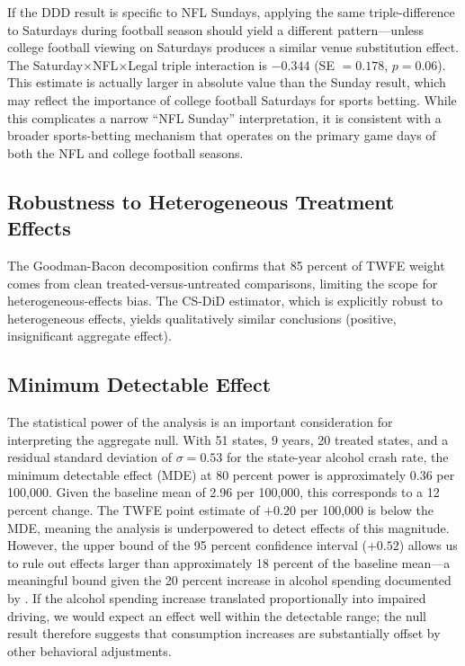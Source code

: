 \documentclass[12pt]{article}
\begin{document}
If the DDD result is specific to NFL Sundays, applying the same triple-difference to Saturdays during football season should yield a different pattern---unless college football viewing on Saturdays produces a similar venue substitution effect. The Saturday$\times$NFL$\times$Legal triple interaction is $-0.344$ (SE $= 0.178$, $p = 0.06$). This estimate is actually larger in absolute value than the Sunday result, which may reflect the importance of college football Saturdays for sports betting. While this complicates a narrow ``NFL Sunday'' interpretation, it is consistent with a broader sports-betting mechanism that operates on the primary game days of both the NFL and college football seasons.

\subsection{Robustness to Heterogeneous Treatment Effects}

The Goodman-Bacon decomposition confirms that 85 percent of TWFE weight comes from clean treated-versus-untreated comparisons, limiting the scope for heterogeneous-effects bias. The CS-DiD estimator, which is explicitly robust to heterogeneous effects, yields qualitatively similar conclusions (positive, insignificant aggregate effect).

\subsection{Minimum Detectable Effect}

The statistical power of the analysis is an important consideration for interpreting the aggregate null. With 51 states, 9 years, 20 treated states, and a residual standard deviation of $\sigma = 0.53$ for the state-year alcohol crash rate, the minimum detectable effect (MDE) at 80 percent power is approximately 0.36 per 100,000. Given the baseline mean of 2.96 per 100,000, this corresponds to a 12 percent change. The TWFE point estimate of $+0.20$ per 100,000 is below the MDE, meaning the analysis is underpowered to detect effects of this magnitude. However, the upper bound of the 95 percent confidence interval ($+0.52$) allows us to rule out effects larger than approximately 18 percent of the baseline mean---a meaningful bound given the 20 percent increase in alcohol spending documented by \citet{taylor2024betting}. If the alcohol spending increase translated proportionally into impaired driving, we would expect an effect well within the detectable range; the null result therefore suggests that consumption increases are substantially offset by other behavioral adjustments.
\end{document}
